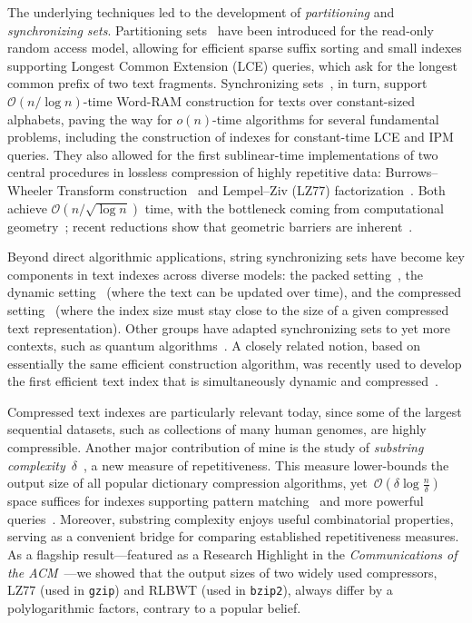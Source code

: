 \documentclass[a4paper,11pt]{article}
\newcommand{\Oh}{\mathcal{O}}
\begin{document}
The underlying techniques led to the development of \emph{partitioning} and \emph{synchronizing sets}.
Partitioning sets~\cite{BGP25} have been introduced for the read-only random access model, allowing for efficient sparse suffix sorting and small indexes supporting Longest Common Extension (LCE) queries, which ask for the longest common prefix of two text fragments.
Synchronizing sets~\cite{STOC2019}, in turn, support $\Oh(n / \log n)$-time Word-RAM construction for texts over constant-sized alphabets, paving the way for $o(n)$-time algorithms for several fundamental problems, including the construction of indexes for constant-time LCE and IPM queries.
They also allowed for the first sublinear-time implementations of two central procedures in lossless compression of highly repetitive data: Burrows--Wheeler Transform construction~\cite{STOC2019} and Lempel--Ziv (LZ77) factorization~\cite{KK24}. 
Both achieve $\Oh(n/\sqrt{\log n})$ time, with the bottleneck coming from computational geometry~\cite{CP10}; recent reductions show that geometric barriers are inherent~\cite{KK25}.

Beyond direct algorithmic applications, string synchronizing sets have become key components in text indexes across diverse models: the packed setting~\cite{SODA2023}, the dynamic setting~\cite{STOC2022} (where the text can be updated over time), and the compressed setting~\cite{FOCS2023b} (where the index size must stay close to the size of a given compressed text representation). 
Other groups have adapted synchronizing sets to yet more contexts, such as quantum algorithms~\cite{DBLP:conf/soda/JinN23}.
A closely related notion, based on essentially the same efficient construction algorithm, was recently used to develop the first efficient text index that is simultaneously dynamic and compressed~\cite{NT24}.

Compressed text indexes are particularly relevant today, since some of the largest sequential datasets, such as collections of many human genomes, are highly compressible. 
Another major contribution of mine is the study of \emph{substring complexity}~$\delta$~\cite{RRRS13,TALG_Christiansen}, a new measure of repetitiveness. 
This measure lower-bounds the output size of all popular dictionary compression algorithms, yet~$\Oh(\delta \log\frac{n}{\delta})$ space suffices for indexes supporting pattern matching~\cite{TIT22} and more powerful queries~\cite{FOCS2023b}. 
Moreover, substring complexity enjoys useful combinatorial properties, serving as a convenient bridge for comparing established repetitiveness measures. 
As a flagship result---featured as a Research Highlight in the \emph{Communications of the ACM}~\cite{CACM2022}---we showed that the output sizes of two widely used compressors, LZ77 (used in \texttt{gzip}) and RLBWT (used in \texttt{bzip2}), always differ by a polylogarithmic factors, contrary to a popular belief.
\end{document}
